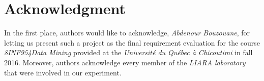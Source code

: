 \documentclass[conference]{IEEEtran}
\begin{document}
\section*{Acknowledgment}

In the first place, authors would like to acknowledge, \textit{Abdenour Bouzouane}, for letting us present such a project as the final requirement evaluation for the course \textit{8INF954\textendash Data Mining} provided at the \textit{Universit\'e du Qu\'ebec \`a Chicoutimi} in fall 2016. Moreover, authors acknowledge every member of the \textit{LIARA laboratory} that were involved in our experiment.




%
%
%

\printbibliography


\end{document}
